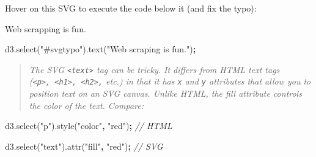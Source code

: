 \documentclass[openany]{book}
\newenvironment{Shaded}{\begin{snugshade}}{\end{snugshade}}
\newcommand{\AttributeTok}[1]{\textcolor[rgb]{0.77,0.63,0.00}{#1}}
\newcommand{\CommentTok}[1]{\textcolor[rgb]{0.56,0.35,0.01}{\textit{#1}}}
\newcommand{\KeywordTok}[1]{\textcolor[rgb]{0.13,0.29,0.53}{\textbf{#1}}}
\newcommand{\NormalTok}[1]{#1}
\newcommand{\OperatorTok}[1]{\textcolor[rgb]{0.81,0.36,0.00}{\textbf{#1}}}
\newcommand{\OtherTok}[1]{\textcolor[rgb]{0.56,0.35,0.01}{#1}}
\newcommand{\StringTok}[1]{\textcolor[rgb]{0.31,0.60,0.02}{#1}}
\newcommand{\VariableTok}[1]{\textcolor[rgb]{0.00,0.00,0.00}{#1}}
\begin{document}
\begin{Shaded}
\end{Shaded}

Hover on this SVG to execute the code below it (and fix the typo):

Web scrapping is fun.

\hypertarget{fixsvgtypo}{}
\begin{Shaded}
\begin{Highlighting}[]
\VariableTok{d3}\NormalTok{.}\AttributeTok{select}\NormalTok{(}\StringTok{"#svgtypo"}\NormalTok{).}\AttributeTok{text}\NormalTok{(}\StringTok{"Web scraping is fun."}\NormalTok{)}\OperatorTok{;}
\end{Highlighting}
\end{Shaded}

\begin{quote}
 \emph{The SVG \texttt{\textless{}text\textgreater{}} tag can be tricky. It differs from HTML text tags (\texttt{\textless{}p\textgreater{},\ \textless{}h1\textgreater{},\ \textless{}h2\textgreater{},} etc.) in that it has \texttt{x} and \texttt{y} attributes that allow you to position text on an SVG canvas. Unlike HTML, the fill attribute controls the color of the text. Compare:}
\end{quote}

\begin{Shaded}
\begin{Highlighting}[]
\VariableTok{d3}\NormalTok{.}\AttributeTok{select}\NormalTok{(}\StringTok{"p"}\NormalTok{).}\AttributeTok{style}\NormalTok{(}\StringTok{"color"}\OperatorTok{,} \StringTok{"red"}\NormalTok{)}\OperatorTok{;}   \CommentTok{// HTML}

\VariableTok{d3}\NormalTok{.}\AttributeTok{select}\NormalTok{(}\StringTok{"text"}\NormalTok{).}\AttributeTok{attr}\NormalTok{(}\StringTok{"fill"}\OperatorTok{,} \StringTok{"red"}\NormalTok{)}\OperatorTok{;}  \CommentTok{// SVG}
\end{Highlighting}
\end{Shaded}
\end{document}
